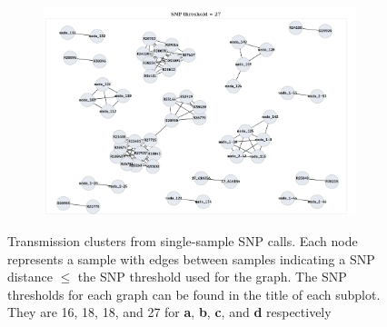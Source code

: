 \begin{figure}
\begin{subfigure}[b]{0.45\textwidth}
         \caption{}
     \end{subfigure}
     \hfill
     \begin{subfigure}[b]{0.45\textwidth}
         \centering
         \includegraphics[width=\textwidth]{Appendix1/Figs/map_clusters_t27.png}
         \caption{}
     \end{subfigure}
        \caption{Transmission clusters from \pandora{} single-sample SNP calls. Each node represents a sample with edges between samples indicating a SNP distance $\le$ the SNP threshold used for the graph. The SNP thresholds for each graph can be found in the title of each subplot. They are 16, 18, 18, and 27 for \textbf{a}, \textbf{b}, \textbf{c}, and \textbf{d} respectively}
        \label{fig:map-original-clusters}
\end{figure}

